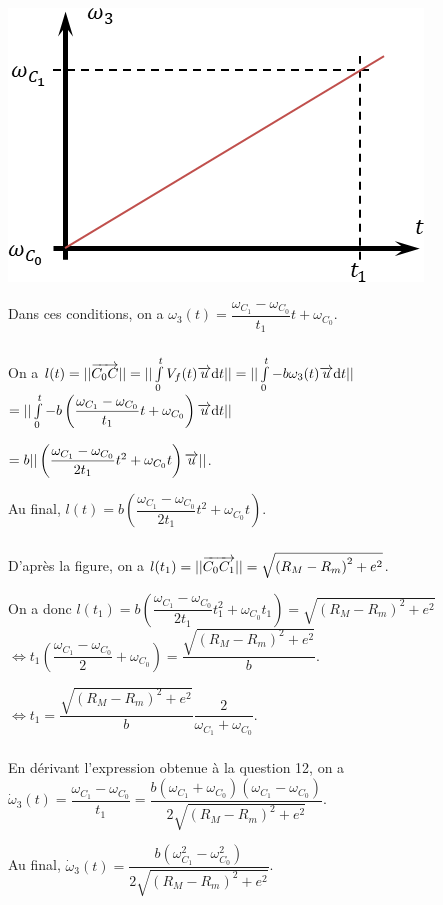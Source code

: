 \documentclass[10pt,fleqn]{article} %
\begin{document}
 \subparagraph{}
 
 \begin{center}
\includegraphics[width=.5\linewidth]{images/fig_05}
\end{center}

Dans ces conditions, on a $\omega_3(t)=\dfrac{\omega_{C_1}-\omega_{C_0}}{t_1}t+\omega_{C_0}$.

\subparagraph{} %
On a $l(t)=||\overrightarrow{C_0C}||=||\int\limits_0^t V_f(t)\overrightarrow{u} \text{d} t||=||\int\limits_0^t -b\omega_3(t) \overrightarrow{u} \text{d} t||$ 
$=||\int\limits_0^t -b\left( \dfrac{\omega_{C_1}-\omega_{C_0}}{t_1}t+\omega_{C_0}\right) \overrightarrow{u} \text{d} t||$

$=b|| \left(  \dfrac{\omega_{C_1}-\omega_{C_0}}{2t_1}t^2+\omega_{C_0}t\right) \overrightarrow{u} ||$.

Au final, 
$l(t)=b \left(  \dfrac{\omega_{C_1}-\omega_{C_0}}{2t_1}t^2+\omega_{C_0}t\right) $.


\subparagraph{} %
D'après la figure, on a  $l(t_1)=||\overrightarrow{C_0C_1}||=\sqrt{\left(R_M-R_m \right)^2+e^2}$.

On a donc $l(t_1)=b \left(  \dfrac{\omega_{C_1}-\omega_{C_0}}{2t_1}t_1^2+\omega_{C_0}t_1\right) =\sqrt{\left(R_M-R_m \right)^2+e^2}$ 
$\Leftrightarrow 
  t_1 \left(\dfrac{\omega_{C_1}-\omega_{C_0}}{2}+\omega_{C_0}\right) =\dfrac{\sqrt{\left(R_M-R_m \right)^2+e^2}}{b}$.

$\Leftrightarrow 
  t_1  =\dfrac{\sqrt{\left(R_M-R_m \right)^2+e^2}}{b} \dfrac{2}{\omega_{C_1}+\omega_{C_0}}$.


\subparagraph{} %

En dérivant l'expression obtenue à la question 12, on a 
$\dot{\omega}_3(t)=\dfrac{\omega_{C_1}-\omega_{C_0}}{t_1} =  \dfrac{b\left( \omega_{C_1}+\omega_{C_0}\right)\left( \omega_{C_1}-\omega_{C_0}\right)}{2\sqrt{\left(R_M-R_m \right)^2+e^2}}  $. 

Au final, $\dot{\omega}_3(t) =\dfrac{b\left( \omega_{C_1}^2-\omega_{C_0}^2\right)}{2\sqrt{\left(R_M-R_m \right)^2+e^2}}  $. 

\subparagraph{} %
\end{document}
